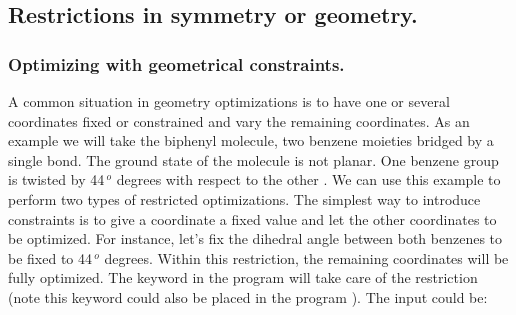 
\subsection{Restrictions in symmetry or geometry.}

\subsubsection{Optimizing with geometrical constraints.}

A common situation in geometry optimizations is to have one or
several coordinates fixed or constrained and vary the remaining coordinates.
As an example we will take the biphenyl molecule, two benzene moieties
bridged by a single bond. The ground state of the molecule is not
planar. One benzene group is twisted by 44$\,^o$ degrees with
respect to the other \cite{Rubio:94}. We can use this example to perform
two types of restricted optimizations. The simplest way to introduce
constraints is to give a coordinate a fixed value and let the other
coordinates to be optimized. For instance, let's fix the dihedral
angle between both benzenes to be fixed to 44$\,^o$ degrees. Within
this restriction, the remaining coordinates will be fully optimized.
The  keyword in the program  will
take care of the restriction (note this keyword could also
be placed in the program ). The input could be:

